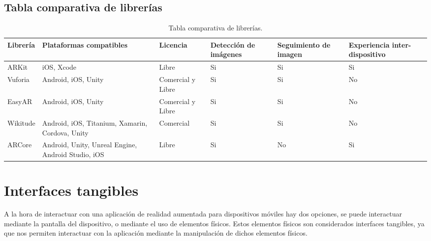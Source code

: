 \subsection{Tabla comparativa de librerías}
\begin{table}[h]
  \begin{center}
    \begin{tabular}{|p{1.5cm}|p{2.3cm}|p{1.7cm}|p{2.2cm}|p{2cm}|p{2cm}|}

      \hline
        \rowcolor{Gray} \textbf{Librería}
        & \textbf{Plataformas compatibles}
        & \textbf{Licencia}
        & \textbf{Detección de imágenes}
        & \textbf{Seguimiento de imagen}
        & \textbf{Experiencia inter-dispositivo}\\

      \hline
      ARKit
      & iOS, Xcode
      & Libre
      & Si
      & Si
      & Si\\

      \hline
      Vuforia
      & Android, iOS, Unity
      & Comercial y Libre
      & Si
      & Si
      & No\\

      \hline
      EasyAR
      & Android, iOS, Unity
      & Comercial y Libre
      & Si
      & Si
      & No\\

      \hline
      Wikitude
      & Android, iOS, Titanium, Xamarin, Cordova, Unity
      & Comercial
      & Si
      & Si
      & No\\

      \hline
      ARCore
      & Android, Unity, Unreal Engine, Android Studio, iOS
      & Libre
      & Si
      & No
      & Si\\

      \hline

    \end{tabular}

    \caption{Tabla comparativa de librerías.}
    \label{tabla-librerias}

  \end{center}
\end{table}

\newpage

\section{Interfaces tangibles}
A la hora de interactuar con una aplicación de realidad aumentada para dispositivos móviles hay dos opciones, se puede interactuar mediante la pantalla del dispositivo, o mediante el uso de elementos físicos. Estos elementos físicos son considerados interfaces tangibles, ya que nos permiten interactuar con la aplicación mediante la manipulación de dichos elementos físicos.\\

